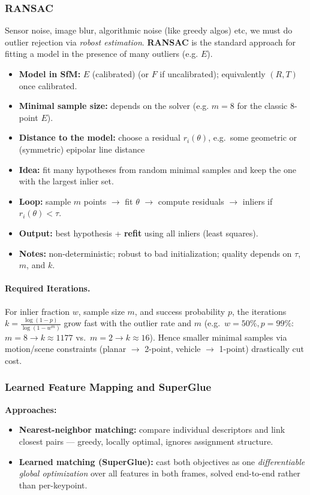 \documentclass{article}
\begin{document}
\subsubsection{RANSAC}
Sensor noise, image blur, algorithmic noise (like greedy algos) etc, we must do outlier rejection via \textit{robost estimation}. \textbf{RANSAC} is the standard approach for fitting a model in the presence of many outliers (e.g. $E$).

\begin{itemize}
    \item \textbf{Model in SfM:} $E$ (calibrated) (or $F$ if uncalibrated); equivalently $(R,T)$ once calibrated.
    \item \textbf{Minimal sample size:} depends on the solver (e.g. $m{=}8$ for the classic 8-point $E$).
    \item \textbf{Distance to the model:} choose a residual $r_i(\theta)$, e.g.\ some geometric or (symmetric) epipolar line distance
\end{itemize}

\begin{itemize}
    \item \textbf{Idea:} fit many hypotheses from random minimal samples and keep the one with the largest inlier set.
    \item \textbf{Loop:} sample $m$ points $\rightarrow$ fit $\theta$ $\rightarrow$ compute residuals $\rightarrow$ inliers if $r_i(\theta)<\tau$.
    \item \textbf{Output:} best hypothesis + \textbf{refit} using all inliers (least squares).
    \item \textbf{Notes:} non-deterministic; robust to bad initialization; quality depends on $\tau$, $m$, and $k$.
\end{itemize}

\paragraph{Required Iterations.} For inlier fraction $w$, sample size $m$, and success probability $p$, the iterations $k=\frac{\log(1-p)}{\log(1-w^m)}$ grow fast with the outlier rate and $m$ (e.g.\ $w=50\%,p=99\%$: $m=8\!\to\!k\approx1177$ vs.\ $m=2\!\to\!k\approx16$). Hence smaller minimal samples via motion/scene constraints (planar $\to$ 2-point, vehicle $\to$ 1-point) drastically cut cost.

\subsubsection{Learned Feature Mapping and SuperGlue}
\textbf{Approaches:}
\begin{itemize}
    \item \textbf{Nearest-neighbor matching:} compare individual descriptors and link closest pairs — greedy, locally optimal, ignores assignment structure.
    \item \textbf{Learned matching (SuperGlue):} cast both objectives as one \textit{differentiable global optimization} over all features in both frames, solved end-to-end rather than per-keypoint.
\end{itemize}
\end{document}

